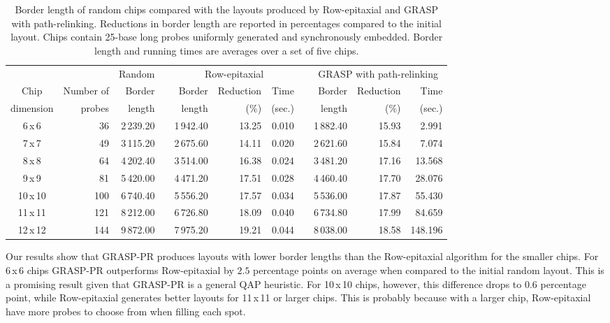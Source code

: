 \documentclass[english]{lni}
\begin{document}
\begin{table}[t]
\caption{Border length of random chips compared with the layouts produced by
Row-epitaxial and GRASP with path-relinking. Reductions in border length are
reported in percentages compared to the initial layout. Chips contain 25-base
long probes uniformly generated and synchronously embedded. Border length and
running times are averages over a set of five chips.\label{tab:graspr_reptx}}
\vspace*{2ex}
\scriptsize{
\begin{tabular}{crrcrrrcrrr}
          &            & Random & & \multicolumn{3}{c}{Row-epitaxial}  & & \multicolumn{3}{c}{GRASP with path-relinking}  \\ \cline{3-3} \cline{5-7} \cline{9-11}
Chip      & Number of  & Border & & Border & Reduction & Time          & & Border & Reduction & Time   \\
dimension & probes     & length & & length & (\%)      & (sec.)        & & length & (\%)      & (sec.) \\
\hline
6\,x\,6   &  36 & 2\,239.20 & & 1\,942.40 & 13.25 & 0.010 & & 1\,882.40 & 15.93 & 2.991   \\
7\,x\,7   &  49 & 3\,115.20 & & 2\,675.60 & 14.11 & 0.020 & & 2\,621.60 & 15.84 & 7.074   \\
8\,x\,8   &  64 & 4\,202.40 & & 3\,514.00 & 16.38 & 0.024 & & 3\,481.20 & 17.16 & 13.568  \\
9\,x\,9   &  81 & 5\,420.00 & & 4\,471.20 & 17.51 & 0.028 & & 4\,460.40 & 17.70 & 28.076  \\
10\,x\,10 & 100 & 6\,740.40 & & 5\,556.20 & 17.57 & 0.034 & & 5\,536.00 & 17.87 & 55.430  \\
11\,x\,11 & 121 & 8\,212.00 & & 6\,726.80 & 18.09 & 0.040 & & 6\,734.80 & 17.99 & 84.659  \\
12\,x\,12 & 144 & 9\,872.00 & & 7\,975.20 & 19.21 & 0.044 & & 8\,038.00 & 18.58 & 148.196 \\
\hline
\end{tabular}}
\end{table}

Our results show that GRASP-PR produces layouts with lower border lengths than
the Row-epitaxial algorithm for the smaller chips. For 6\,x\,6 chips GRASP-PR
outperforms Row-epitaxial by $2.5$ percentage points on average when compared to
the initial random layout. This is a promising result given that GRASP-PR is a
general QAP heuristic. For 10\,x\,10 chips, however, this difference drops to
$0.6$ percentage point, while Row-epitaxial generates better layouts for 11\,x\,11
or larger chips. This is probably because with a larger chip, Row-epitaxial have
more probes to choose from when filling each spot.
\end{document}

